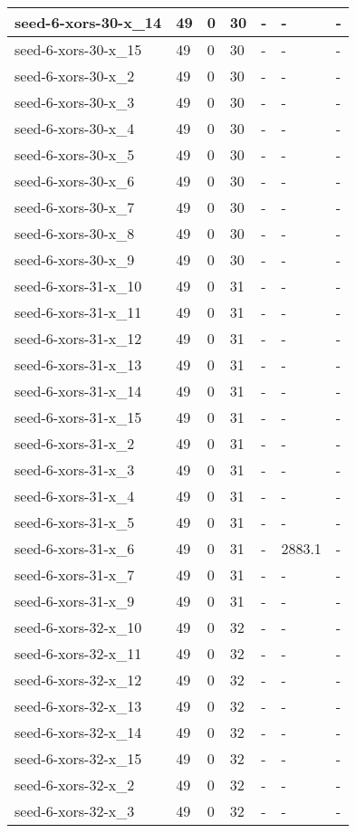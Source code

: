 \begin{scriptsize}
\begin{longtable}{|p{5cm}|l|l|l|l|l|l|}
seed-6-xors-30-x\_14&49&0&30&-&-&- \\ \hline 
seed-6-xors-30-x\_15&49&0&30&-&-&- \\ \hline 
seed-6-xors-30-x\_2&49&0&30&-&-&- \\ \hline 
seed-6-xors-30-x\_3&49&0&30&-&-&- \\ \hline 
seed-6-xors-30-x\_4&49&0&30&-&-&- \\ \hline 
seed-6-xors-30-x\_5&49&0&30&-&-&- \\ \hline 
seed-6-xors-30-x\_6&49&0&30&-&-&- \\ \hline 
seed-6-xors-30-x\_7&49&0&30&-&-&- \\ \hline 
seed-6-xors-30-x\_8&49&0&30&-&-&- \\ \hline 
seed-6-xors-30-x\_9&49&0&30&-&-&- \\ \hline 
seed-6-xors-31-x\_10&49&0&31&-&-&- \\ \hline 
seed-6-xors-31-x\_11&49&0&31&-&-&- \\ \hline 
seed-6-xors-31-x\_12&49&0&31&-&-&- \\ \hline 
seed-6-xors-31-x\_13&49&0&31&-&-&- \\ \hline 
seed-6-xors-31-x\_14&49&0&31&-&-&- \\ \hline 
seed-6-xors-31-x\_15&49&0&31&-&-&- \\ \hline 
seed-6-xors-31-x\_2&49&0&31&-&-&- \\ \hline 
seed-6-xors-31-x\_3&49&0&31&-&-&- \\ \hline 
seed-6-xors-31-x\_4&49&0&31&-&-&- \\ \hline 
seed-6-xors-31-x\_5&49&0&31&-&-&- \\ \hline 
seed-6-xors-31-x\_6&49&0&31&-&2883.1&- \\ \hline 
seed-6-xors-31-x\_7&49&0&31&-&-&- \\ \hline 
seed-6-xors-31-x\_9&49&0&31&-&-&- \\ \hline 
seed-6-xors-32-x\_10&49&0&32&-&-&- \\ \hline 
seed-6-xors-32-x\_11&49&0&32&-&-&- \\ \hline 
seed-6-xors-32-x\_12&49&0&32&-&-&- \\ \hline 
seed-6-xors-32-x\_13&49&0&32&-&-&- \\ \hline 
seed-6-xors-32-x\_14&49&0&32&-&-&- \\ \hline 
seed-6-xors-32-x\_15&49&0&32&-&-&- \\ \hline 
seed-6-xors-32-x\_2&49&0&32&-&-&- \\ \hline 
seed-6-xors-32-x\_3&49&0&32&-&-&- \\ \hline 

\end{longtable}
\end{scriptsize}
